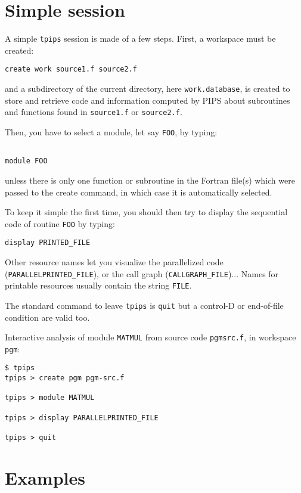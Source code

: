 \documentclass[a4paper,12pt]{article}
\begin{document}
\section{Simple session}

A simple {\tt tpips} session is made of a few steps. First, a
workspace must be created:
{\bf
\begin{verbatim}
create work source1.f source2.f
\end{verbatim}
}

and a subdirectory of the current directory, here
\texttt{work.database}, is created to store and retrieve
code and information computed by PIPS about subroutines and
functions found in \texttt{source1.f} or \texttt{source2.f}.

Then, you have to select a module, let say \texttt{FOO}, by typing:
{\bf
\begin{verbatim}

module FOO
\end{verbatim}
}

unless there is only one function or subroutine in the Fortran
file(s) which were passed to the create command, in
which case it is automatically selected.

To keep it simple the first time, you should then try to
display the sequential code of routine \texttt{FOO} by typing:

{\bf
\begin{verbatim}
display PRINTED_FILE
\end{verbatim}
}

Other resource names let you visualize the parallelized code
(\texttt{PARALLELPRINTED\_FILE}), or the call graph
(\texttt{CALLGRAPH\_FILE})...  Names for printable resources usually
contain the string \texttt{FILE}.

The standard command to leave {\tt tpips} is {\tt quit} but a control-D
or end-of-file condition are valid too.

Interactive analysis of module \texttt{MATMUL} from source code
\texttt{pgmsrc.f}, in workspace \texttt{pgm}:

{\bf
\begin{verbatim}
$ tpips
tpips > create pgm pgm-src.f

tpips > module MATMUL

tpips > display PARALLELPRINTED_FILE

tpips > quit

\end{verbatim}
}

\section{Examples}
\end{document}

